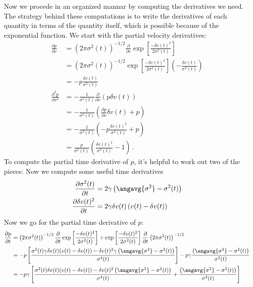 Now we procede in an organized mannar by computing the derivatives we need.
The strategy behind these computations is to write the derivatives of each quantity in terms of the quantity itself, which is possible because of the exponential function.
We start with the partial velocity derivatives:
\begin{align*}
  \frac{\partial p}{\partial v}
  &= \left( 2 \pi \sigma^2(t) \right)^{-1/2}
    \frac{\partial}{\partial v}
    \exp \left[
      \frac{-\delta v(t)^2}{2 \sigma^2(t)}
    \right] \\
  &= \left( 2 \pi \sigma^2(t) \right)^{-1/2}
    \exp \left[
      \frac{-\delta v(t)^2}{2 \sigma^2(t)}
    \right]
    \left(- \frac{\delta v(t)}{\sigma^2(t)} \right) \\
  &= - p \frac{\delta v(t)}{\sigma^2(t)} \\
  \frac{\partial^2 p}{\partial v^2}
  &= - \frac{1}{\sigma^2(t)} \frac{\partial}{\partial v}\left( p \delta v(t) \right) \\
  &= - \frac{1}{\sigma^2(t)} \left( \frac{\partial p}{\partial v} \delta v(t) + p \right) \\
  &= - \frac{1}{\sigma^2(t)}
    \left( -p \frac{\delta v(t)^2}{\sigma^2(t)} + p \right) \\
  &=  \frac{p}{\sigma^2(t)}
    \left( \frac{\delta v(t)^2}{\sigma^2(t)} - 1 \right)
  \, .
\end{align*}
To compute the partial time derivative of $p$, it's helpful to work out two of the pieces:
Now we compute some useful time derivatives
\begin{align*}
  \frac{\partial \sigma^2(t)}{\partial t}
  &= 2 \gamma \left( \angavg{\sigma^2} - \sigma^2(t) \right) \\
  \frac{\partial \delta v(t)^2}{\partial t}
  &= 2 \gamma \delta v(t) \left( v(t) - \delta v(t) \right)
\end{align*}
Now we go for the partial time derivative of $p$:
\begin{align*}
  \frac{\partial p}{\partial t}
  &= \left( 2 \pi \sigma^2(t) \right)^{-1/2} \frac{\partial}{\partial t}
    \exp \left[ \frac{- \delta v(t)^2}{2 \sigma^2(t)} \right]
    + \exp \left[ \frac{- \delta v(t)^2}{2 \sigma^2(t)} \right] \frac{\partial}{\partial t}
    \left( 2 \pi \sigma^2(t) \right)^{-1/2} \\
  &= -p \left[ 
    \frac{\sigma^2(t) \gamma \delta v(t) (v(t) - \delta v(t)) - \delta v(t)^2 \gamma \left(
      \angavg{\sigma^2} - \sigma^2(t) \right)}{\sigma^4(t)}
  \right]
  - p \gamma \frac{\left( \angavg{\sigma^2} - \sigma^2(t) \right)}{\sigma^2(t)} \\
  &= -p \gamma \left[ 
    \frac{\sigma^2(t) \delta v(t) (v(t) - \delta v(t)) - \delta v(t)^2 \left(
      \angavg{\sigma^2} - \sigma^2(t) \right)}{\sigma^4(t)}
    + \frac{\left( \angavg{\sigma^2} - \sigma^2(t) \right)}{\sigma^2(t)}
    \right]
\end{align*}
